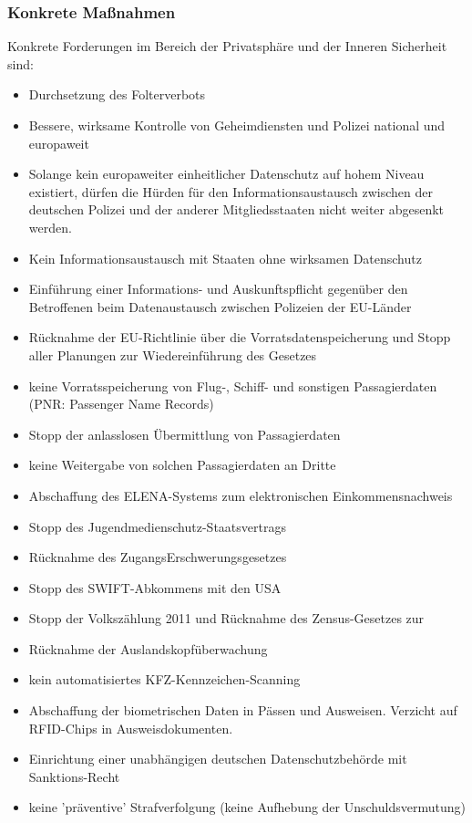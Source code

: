 \subsubsection{Konkrete Maßnahmen}
\abstimmung
Konkrete Forderungen im Bereich der Privatsphäre und der Inneren Sicherheit sind:
\begin{itemize}
\item Durchsetzung des Folterverbots
\item Bessere, wirksame Kontrolle von Geheimdiensten und Polizei national und europaweit
\item Solange kein europaweiter einheitlicher Datenschutz auf hohem Niveau existiert, dürfen die Hürden für den Informationsaustausch zwischen der deutschen Polizei und der anderer Mitgliedsstaaten nicht weiter abgesenkt werden.
\item Kein Informationsaustausch mit Staaten ohne wirksamen Datenschutz
\item Einführung einer Informations- und Auskunftspflicht gegenüber den Betroffenen beim Datenaustausch zwischen Polizeien der EU-Länder
\item Rücknahme der EU-Richtlinie über die Vorratsdatenspeicherung und Stopp aller Planungen zur Wiedereinführung des Gesetzes
\item keine Vorratsspeicherung von Flug-, Schiff- und sonstigen Passagierdaten (PNR: Passenger Name Records)
\item Stopp der anlasslosen Übermittlung von Passagierdaten
\item keine Weitergabe von solchen Passagierdaten an Dritte
\item Abschaffung des ELENA-Systems zum elektronischen Einkommensnachweis
\item Stopp des Jugendmedienschutz-Staatsvertrags
\item Rücknahme des ZugangsErschwerungsgesetzes
\item Stopp des SWIFT-Abkommens mit den USA
\item Stopp der Volkszählung 2011 und Rücknahme des Zensus-Gesetzes zur
\item Rücknahme der Auslandskopfüberwachung
\item kein automatisiertes KFZ-Kennzeichen-Scanning
\item Abschaffung der biometrischen Daten in Pässen und Ausweisen. Verzicht auf RFID-Chips in Ausweisdokumenten.
\item Einrichtung einer unabhängigen deutschen Datenschutzbehörde mit Sanktions-Recht
\item keine 'präventive' Strafverfolgung (keine Aufhebung der Unschuldsvermutung)

\end{itemize}
